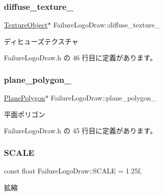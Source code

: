 \subsubsection{\texorpdfstring{diffuse\+\_\+texture\+\_\+}{diffuse\_texture\_}}
{\footnotesize\ttfamily \mbox{\hyperlink{class_texture_object}{Texture\+Object}}$\ast$ Failure\+Logo\+Draw\+::diffuse\+\_\+texture\+\_\+\hspace{0.3cm}{\ttfamily [private]}}



ディヒューズテクスチャ 



 Failure\+Logo\+Draw.\+h の 46 行目に定義があります。

\mbox{\label{class_failure_logo_draw_a5de75c49fbbbb9e1a9a8445666aa2bf3}} 
\subsubsection{\texorpdfstring{plane\+\_\+polygon\+\_\+}{plane\_polygon\_}}
{\footnotesize\ttfamily \mbox{\hyperlink{class_plane_polygon}{Plane\+Polygon}}$\ast$ Failure\+Logo\+Draw\+::plane\+\_\+polygon\+\_\+\hspace{0.3cm}{\ttfamily [private]}}



平面ポリゴン 



 Failure\+Logo\+Draw.\+h の 45 行目に定義があります。

\mbox{\label{class_failure_logo_draw_a356d2f6f14682ad6f2e9a01ffdd587b0}} 
\subsubsection{\texorpdfstring{S\+C\+A\+LE}{SCALE}}
{\footnotesize\ttfamily const float Failure\+Logo\+Draw\+::\+S\+C\+A\+LE = 1.\+25f\hspace{0.3cm}{\ttfamily [static]}, {\ttfamily [private]}}



拡縮 



